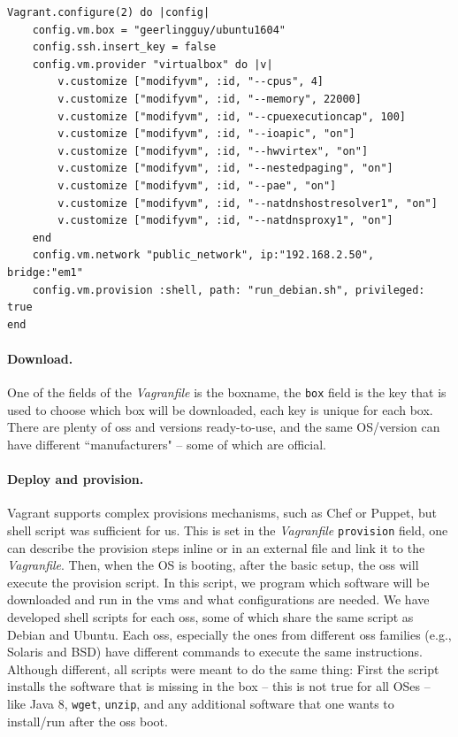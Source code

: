 \begin{lstlisting}[style=mystyle,caption=Windows Server 2016 Vagrantfile,label=vagrantfile]
Vagrant.configure(2) do |config|
	config.vm.box = "geerlingguy/ubuntu1604"
	config.ssh.insert_key = false
	config.vm.provider "virtualbox" do |v|
		v.customize ["modifyvm", :id, "--cpus", 4]
		v.customize ["modifyvm", :id, "--memory", 22000]
		v.customize ["modifyvm", :id, "--cpuexecutioncap", 100]
		v.customize ["modifyvm", :id, "--ioapic", "on"]
		v.customize ["modifyvm", :id, "--hwvirtex", "on"]
		v.customize ["modifyvm", :id, "--nestedpaging", "on"]
		v.customize ["modifyvm", :id, "--pae", "on"]
		v.customize ["modifyvm", :id, "--natdnshostresolver1", "on"]
		v.customize ["modifyvm", :id, "--natdnsproxy1", "on"]
	end
	config.vm.network "public_network", ip:"192.168.2.50", bridge:"em1"
	config.vm.provision :shell, path: "run_debian.sh", privileged: true
end
\end{lstlisting}


\paragraph{Download.}
One of the fields of the \emph{Vagranfile} is the boxname, the \texttt{box} field is the key that is used to choose which box will be downloaded, each key is unique for each box.
There are plenty of \glspl{os} and versions ready-to-use, and the same OS/version can have different ``manufacturers" -- some of which are official.

\paragraph{Deploy and provision.}
Vagrant supports complex provisions mechanisms, such as Chef or Puppet, but shell script was sufficient for us. 
This is set in the \emph{Vagranfile} \texttt{provision} field, one can describe the provision steps inline or in an external file and link it to the \emph{Vagranfile}.
Then, when the OS is booting, after the basic setup, the \glspl{os} will execute the provision script.
In this script, we program which software will be downloaded and run in the \glspl{vm} and what configurations are needed. 
We have developed shell scripts for each \glspl{os}, some of which share the same script as Debian and Ubuntu. 
Each \glspl{os}, especially the ones from different \glspl{os} families (e.g., Solaris and BSD) have different commands to execute the same instructions.
Although different, all scripts were meant to do the same thing:
First the script installs the software that is missing in the box -- this is not true for all OSes -- like Java 8, \texttt{wget}, \texttt{unzip}, and any additional software that one wants to install/run after the \glspl{os} boot.



